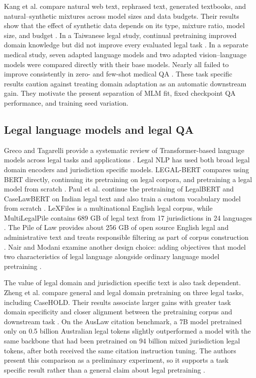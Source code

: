 \documentclass[pdflatex,sn-basic]{sn-jnl}
\begin{document}
Kang et al. compare natural web text, rephrased text, generated textbooks, and
natural--synthetic mixtures across model sizes and data budgets. Their results
show that the effect of synthetic data depends on its type, mixture ratio, model
size, and budget \citep{kangSyntheticDataPretraining2025}. In a Taiwanese legal
study, continual pretraining improved domain knowledge but did not improve every
evaluated legal task \citep{chenContinualPretraining2025}. In a separate medical
study, seven adapted language models and two adapted vision--language models
were compared directly with their base models. Nearly all failed to improve
consistently in zero- and few-shot medical QA
\citep{jeongMedicalAdaptation2024}. These task specific results caution against
treating domain adaptation as an automatic downstream gain. They motivate the
present separation of MLM fit, fixed checkpoint QA performance, and
training seed variation.

\subsection{Legal language models and legal QA}

Greco and Tagarelli provide a systematic review of Transformer-based language
models across legal tasks and applications
\citep{grecoBringingOrderTransformer2024}.
Legal NLP has used both broad legal domain encoders and jurisdiction specific
models. LEGAL-BERT compares using BERT directly, continuing its pretraining on
legal corpora, and pretraining a legal model from scratch
\citep{chalkidisLEGALBERTMuppetsStraight2020}. Paul et al. continue the
pretraining of LegalBERT and CaseLawBERT on Indian legal text and also train a
custom vocabulary model from scratch \citep{paul2023pre}. LeXFiles is a
multinational English legal corpus, while MultiLegalPile contains 689 GB of
legal text from 17 jurisdictions in 24 languages
\citep{chalkidisLeXFilesLegalLAMA2023,niklausMultiLegalPile2024}. The Pile of
Law provides about 256 GB of open source English legal and administrative text
and treats responsible filtering as part of corpus construction
\citep{hendersonPileLaw2022}. Nair and Modani examine another design choice:
adding objectives that model two characteristics of legal language alongside
ordinary language model pretraining \citep{nairLegalCharacteristics2023}.

The value of legal domain and jurisdiction specific text is also
task dependent. Zheng et al. compare general and legal domain pretraining on
three legal tasks, including CaseHOLD. Their results associate larger gains
with greater task domain specificity and closer alignment between the
pretraining corpus and downstream task \citep{zhengWhenDoesPretraining2021}.
On the AusLaw citation benchmark, a 7B model pretrained only on 0.5 billion
Australian legal tokens slightly outperformed a model with the same backbone
that had been pretrained on 94 billion mixed jurisdiction legal tokens, after
both received the same citation instruction tuning. The authors present this
comparison as a preliminary experiment, so it supports a task specific result
rather than a general claim about legal pretraining \citep{han2026legal}.
\end{document}
